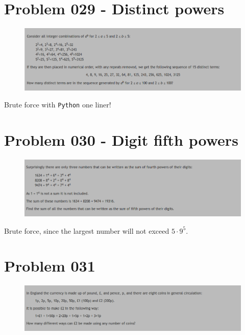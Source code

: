 \section{Problem 029 - Distinct powers}
\begin{prob}
	\begin{figure}[htb!]
		\begin{center}
			\includegraphics[scale = 0.4]{pic/029.png}
		\end{center}
	\end{figure}
\end{prob}
\begin{sol}
Brute force with \texttt{Python} one liner!
\end{sol}

\section{Problem 030 - Digit fifth powers}
\begin{prob}
	\begin{figure}[htb!]
		\begin{center}
			\includegraphics[scale = 0.4]{pic/030.png}
		\end{center}
	\end{figure}
\end{prob}
\begin{sol}
Brute force, since the largest number will not exceed $5 \cdot 9 ^5$.
\end{sol}

\section{Problem 031}
\begin{prob}
	\begin{figure}[htb!]
		\begin{center}
			\includegraphics[scale = 0.4]{pic/031.png}
		\end{center}
	\end{figure}
\end{prob}

